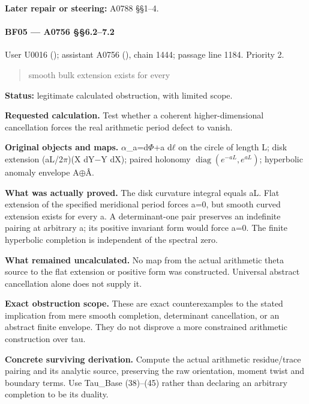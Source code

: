 \textbf{Later repair or steering:} A0788 §§1--4.

\paragraph{BF05 --- A0756 §§6.2--7.2}\label{bf05-a0756-6.27.2}

User U0016 (\protect{});
assistant A0756 (\protect{}),
chain 1444; passage line 1184. Priority 2.

\begin{quote}
smooth bulk extension exists for every
\end{quote}

\textbf{Status:} legitimate calculated obstruction, with limited scope.

\textbf{Requested calculation.} Test whether a coherent
higher-dimensional cancellation forces the real arithmetic period defect
to vanish.

\textbf{Original objects and maps.}
\allowbreak{}\ensuremath{α}\allowbreak{}\_a=d\allowbreak{}\ensuremath{Φ}\allowbreak{}+a
d\allowbreak{}\ensuremath{ℓ}\allowbreak{} on the circle of length L;
disk extension (aL/2\allowbreak{}\ensuremath{π}\allowbreak{})(X
dY\allowbreak{}\ensuremath{−}\allowbreak{}Y dX); paired holonomy
\(\operatorname{diag}(e^{-aL},e^{aL})\); hyperbolic anomaly envelope
A\allowbreak{}\ensuremath{⊕}\allowbreak{}Â.

\textbf{What was actually proved.} The disk curvature integral equals
aL. Flat extension of the specified meridional period forces a=0, but
smooth curved extension exists for every a. A determinant-one pair
preserves an indefinite pairing at arbitrary a; its positive invariant
form would force a=0. The finite hyperbolic completion is independent of
the spectral zero.

\textbf{What remained uncalculated.} No map from the actual arithmetic
theta source to the flat extension or positive form was constructed.
Universal abstract cancellation alone does not supply it.

\textbf{Exact obstruction scope.} These are exact counterexamples to the
stated implication from mere smooth completion, determinant
cancellation, or an abstract finite envelope. They do not disprove a
more constrained arithmetic construction over tau.

\textbf{Concrete surviving derivation.} Compute the actual arithmetic
residue/trace pairing and its analytic source, preserving the raw
orientation, moment twist and boundary terms. Use Tau\_Base (38)--(45)
rather than declaring an arbitrary completion to be its duality.

